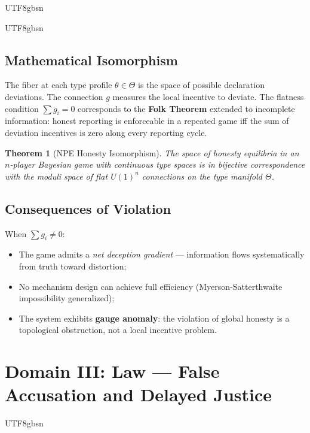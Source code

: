 \documentclass[11pt,a4paper]{article}
\newtheorem{theorem}{Theorem}[section]
\begin{document}
\begin{CJK}{UTF8}{gbsn}
{\begin{CJK}{UTF8}{gbsn}
\subsection{Mathematical Isomorphism}
\begin{center}
\end{center}
The fiber at each type profile $\theta \in \Theta$ is the space of possible
declaration deviations. The connection $g$ measures the local incentive to deviate.
The flatness condition $\sum g_i = 0$ corresponds to the \textbf{Folk Theorem} extended
to incomplete information: honest reporting is enforceable in a repeated game iff the
sum of deviation incentives is zero along every reporting cycle.
\begin{theorem}[NPE Honesty Isomorphism]
The space of honesty equilibria in an $n$-player Bayesian game with continuous type
spaces is in bijective correspondence with the moduli space of flat $U(1)^n$
connections on the type manifold $\Theta$.
\end{theorem}
\subsection{Consequences of Violation}
When $\sum g_i \neq 0$:
\begin{itemize}
    \item The game admits a \textit{net deception gradient} --- information flows
          systematically from truth toward distortion;
    \item No mechanism design can achieve full efficiency (Myerson-Satterthwaite
          impossibility generalized);
    \item The system exhibits \textbf{gauge anomaly}: the violation of global
          honesty is a topological obstruction, not a local incentive problem.
\end{itemize}
\end{CJK}
\section{Domain III: Law --- False Accusation and Delayed Justice}
\label{sec:law}
\begin{CJK}{UTF8}{gbsn}

\end{CJK}}
\end{CJK}
\end{document}
